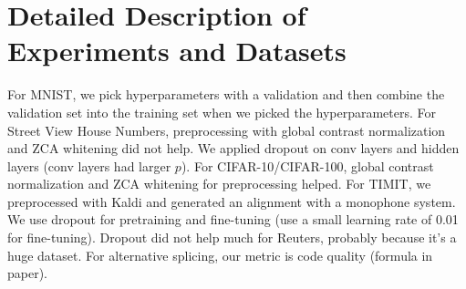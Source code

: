 \documentclass[a4paper]{article}
\begin{document}
\section{Detailed Description of Experiments and Datasets}
For MNIST, we pick hyperparameters with a validation and then combine
the validation set into the training set when we picked the hyperparameters.
For Street View House Numbers, preprocessing with global contrast normalization
and ZCA whitening did not help. We applied dropout on conv layers and hidden
layers (conv layers had larger $p$). For CIFAR-10/CIFAR-100, global contrast
normalization and ZCA whitening for preprocessing helped. For TIMIT, we
preprocessed with Kaldi and generated an alignment with a monophone system. We
use dropout for pretraining and fine-tuning (use a small learning rate of 0.01
for fine-tuning). Dropout did not help much for Reuters, probably because it's
a huge dataset. For alternative splicing, our metric is code quality (formula
in paper).
\end{document}

